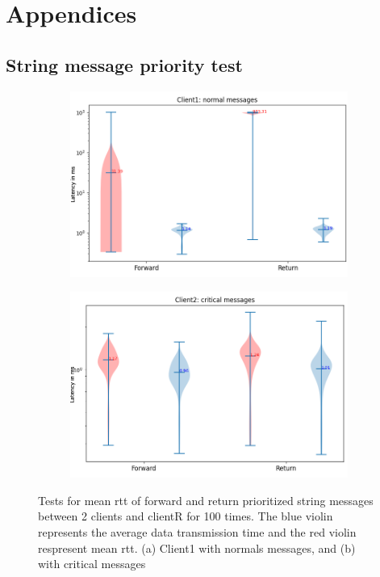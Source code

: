 \chapter{Appendices}\label{chap: append}
\section{String message priority test}\label{chap: append-string-priority}
%
\begin{figure}[htb]
    \centering
    \begin{subfigure}[b]{0.99\textwidth}
    \includegraphics[width=\textwidth]{figures/appendix/priority_tests/log_violin_2clients_string_priority_client1.png}\hfill 
    \caption{} \label{fig: priority-2clients-string-1}
    \end{subfigure}
    \begin{subfigure}[b]{0.99\textwidth}
        \includegraphics[width=\textwidth]{figures/appendix/priority_tests/log_violin_2clients_string_priority_client2.png}\hfill 
        \caption{} \label{fig: priority-2clients-string-2}
    \end{subfigure}
    
    
    \caption{Tests for mean \gls{rtt} of forward and return prioritized string messages between 2 clients 
    and clientR for 100 times. The blue violin represents the average data transmission time and the red violin 
    respresent mean \gls{rtt}. (a) Client1 with normals messages, and (b) 
    with critical messages} \label{fig: priority-2clients-string}
\end{figure}
